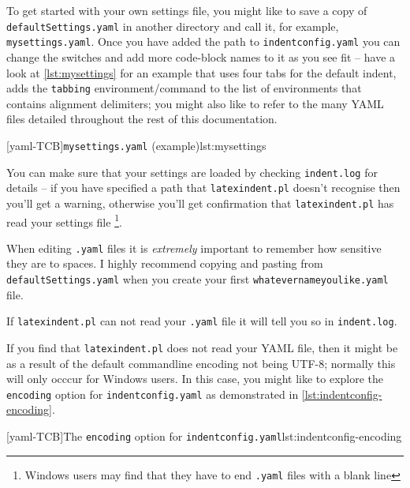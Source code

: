  To get started with your own settings file, you might like to save a copy of
 \texttt{defaultSettings.yaml} in another directory and call it, for example,
 \texttt{mysettings.yaml}. Once you have added the path to \texttt{indentconfig.yaml} you
 can change the switches and add more code-block names to it as you see fit -- have a
 look at \cref{lst:mysettings} for an example that uses four tabs for the default indent,
 adds the \texttt{tabbing} environment/command to the list of environments that contains
 alignment delimiters; you might also like to refer to the many YAML files detailed
 throughout the rest of this documentation. 

 [yaml-TCB]{\texttt{mysettings.yaml} (example)}{lst:mysettings}

 You can make sure that your settings are loaded by checking \texttt{indent.log} for
 details -- if you have specified a path that \texttt{latexindent.pl} doesn't recognise
 then you'll get a warning, otherwise you'll get confirmation that
 \texttt{latexindent.pl} has read your settings file \footnote{Windows users may find
 that they have to end \texttt{.yaml} files with a blank line}. 

 \begin{warning}
  When editing \texttt{.yaml} files it is \emph{extremely} important to remember how
  sensitive they are to spaces. I highly recommend copying and pasting from
  \texttt{defaultSettings.yaml} when you create your first
  \texttt{whatevernameyoulike.yaml} file.

  If \texttt{latexindent.pl} can not read your \texttt{.yaml} file it will tell you so in
  \texttt{indent.log}.
 \end{warning}

 If you find that 
 \texttt{latexindent.pl} does not read your YAML file, then it might be as a result of
 the default commandline encoding not being UTF-8; normally this will only occcur for
 Windows users. In this case, you might like to explore the \texttt{encoding} option for
 \texttt{indentconfig.yaml} as demonstrated in \cref{lst:indentconfig-encoding}.%

 [yaml-TCB]{The \texttt{encoding} option for \texttt{indentconfig.yaml}}{lst:indentconfig-encoding}

